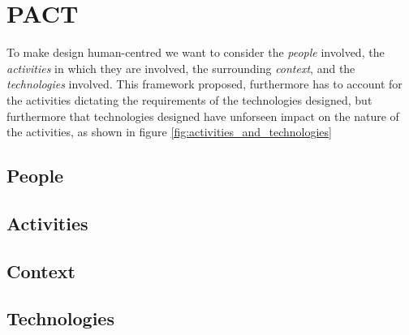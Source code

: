 \section{PACT} \label{sec:pact} 
To make design human-centred we want to consider the \emph{people} involved, the \emph{activities} in which they are involved, the surrounding \emph{context}, and the \emph{technologies} involved. This framework proposed, furthermore has to account for the activities dictating the requirements of the technologies designed, but furthermore that technologies designed have unforseen impact on the nature of the activities, as shown in figure \ref{fig:activities_and_technologies} \cite[p. 25-26]{benyon_14}



\subsection{People}



\subsection{Activities}

\subsection{Context}

\subsection{Technologies}